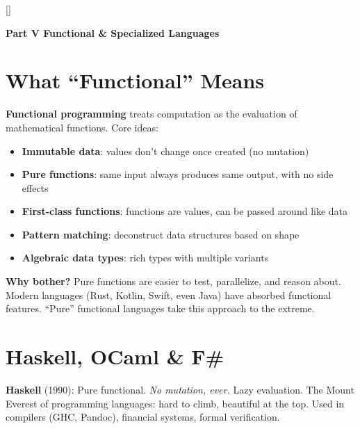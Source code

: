 \documentclass[11pt, letterpaper]{article}
\newcommand{\tealsections}{%
  \titleformat{\section}{\large\bfseries\color{sectionteal}}{}{0em}{}[\color{sectionteal}\titlerule]%
  \titleformat{\subsection}{\normalsize\bfseries\color{sectionteal!80!black}}{}{0em}{}%
}
\newcommand{\partbanner}[3]{%
  \begin{tcolorbox}[colback=#1, colframe=#2, boxrule=1.2pt, arc=4pt,
    left=8pt, right=8pt, top=6pt, bottom=6pt]
    \begin{center}{\LARGE\bfseries #3}\end{center}
  \end{tcolorbox}%
}
\begin{document}
\newpage

\tealsections
{}
\partbanner{part5bg}{sectionteal}{Part V \quad Functional \& Specialized Languages}

\vspace{8pt}

\section*{What ``Functional'' Means}

\textbf{Functional programming} treats computation as the evaluation of mathematical functions. Core ideas:
\begin{itemize}[noitemsep]
  \item \textbf{Immutable data}: values don't change once created (no mutation)
  \item \textbf{Pure functions}: same input always produces same output, with no side effects
  \item \textbf{First-class functions}: functions are values, can be passed around like data
  \item \textbf{Pattern matching}: deconstruct data structures based on shape
  \item \textbf{Algebraic data types}: rich types with multiple variants
\end{itemize}

\textbf{Why bother?} Pure functions are easier to test, parallelize, and reason about. Modern languages (Rust, Kotlin, Swift, even Java) have absorbed functional features. ``Pure'' functional languages take this approach to the extreme.

\section*{Haskell, OCaml \& F\#}

\textbf{Haskell} (1990): Pure functional. \emph{No mutation, ever.} Lazy evaluation. The Mount Everest of programming languages: hard to climb, beautiful at the top. Used in compilers (GHC, Pandoc), financial systems, formal verification.
\end{document}
